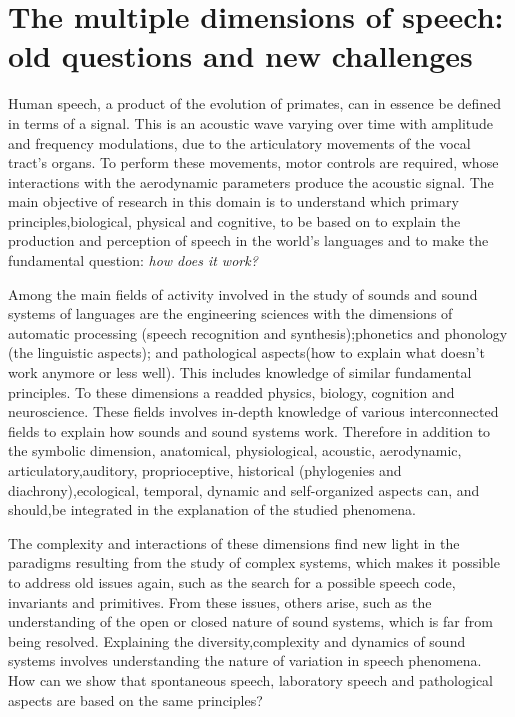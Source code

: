 \chapter{The multiple dimensions of speech: old questions and new challenges}\label{ch:didier}
\begin{affils}
\end{affils}

\noindent 
Human speech, a product of the evolution of primates, can in essence be defined
in terms of a signal. This is an acoustic wave varying over time with amplitude
and frequency modulations, due to the articulatory movements of the vocal
tract’s organs. To perform these movements, motor controls are required, whose
interactions with the aerodynamic parameters produce the acoustic signal. The
main objective of research in this domain is to understand which primary
principles,biological, physical and cognitive, to be based on to explain
the production and perception of speech in the world’s languages and to make the
fundamental question: \textit{how does it work?}

Among the main fields of activity involved in the study of sounds and sound
systems of languages are the engineering sciences with the dimensions of
automatic processing (speech recognition and synthesis);phonetics and phonology
(the linguistic aspects); and pathological aspects(how to explain what doesn't
work anymore or less well). This includes knowledge of similar fundamental
principles. To these dimensions a readded physics, biology, cognition and
neuroscience. These fields involves in-depth knowledge of various
interconnected fields to explain how sounds and sound systems work. Therefore in
addition to the symbolic dimension, anatomical, physiological, acoustic,
aerodynamic, articulatory,auditory, proprioceptive, historical (phylogenies
and diachrony),ecological, temporal, dynamic and self-organized aspects can,
and should,be integrated in the explanation of the studied phenomena.

The complexity and interactions of these dimensions find new light in the
paradigms resulting from the study of complex systems, which makes it possible
to address old issues again, such as the search for a possible speech code,
invariants and primitives. From these issues, others arise, such as the
understanding of the open or closed nature of sound systems, which is far from
being resolved. Explaining the diversity,complexity and dynamics of sound
systems involves understanding the nature of variation in speech phenomena. How
can we show that spontaneous speech, laboratory speech and pathological aspects
are based on the same principles?

